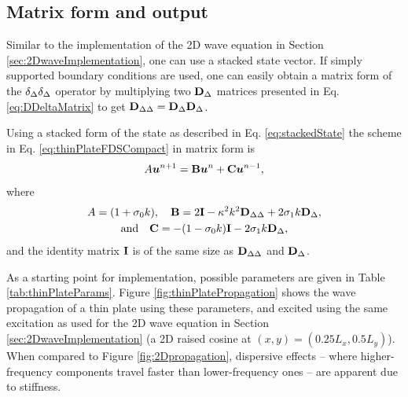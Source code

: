 \subsection{Matrix form and output}
Similar to the implementation of the 2D wave equation in Section \ref{sec:2DwaveImplementation}, one can use a stacked state vector. If simply supported boundary conditions are used, one can easily obtain a matrix form of the $\delta_{\Delta}\delta_{\Delta}$ operator by multiplying two $\mathbf{D}_\Delta$ matrices presented in Eq. \eqref{eq:DDeltaMatrix} to get $\mathbf{D}_{\Delta\Delta} = \mathbf{D}_\Delta\mathbf{D}_\Delta$.

Using a stacked form of the state as described in Eq. \eqref{eq:stackedState} the scheme in Eq. \eqref{eq:thinPlateFDSCompact} in matrix form is     
\begin{equation}\label{eq:matrixFormThinPlate}
    A\boldsymbol{u}^{n+1} = \mathbf{B}\boldsymbol{u}^n + \mathbf{C}\boldsymbol{u}^{n-1},
\end{equation}
where
\begin{gather*}
    A = (1+\sigma_{0} k),\quad \mathbf{B} = 2\mathbf{I} - \kappa^2 k^2 \mathbf{D}_{\Delta\Delta} + 2 \sigma_{1} k\mathbf{D}_\Delta, \\
    \text{and}\quad \mathbf{C} = -(1-\sigma_{0} k)\mathbf{I} - 2\sigma_{1} k \mathbf{D}_\Delta,
\end{gather*}
and the identity matrix $\mathbf{I}$ is of the same size as $\mathbf{D}_{\Delta\Delta}$ and $\mathbf{D}_\Delta$.

As a starting point for implementation, possible parameters are given in Table \ref{tab:thinPlateParams}. Figure \ref{fig:thinPlatePropagation} shows the wave propagation of a thin plate using these parameters, and excited using the same excitation as used for the 2D wave equation in Section \ref{sec:2DwaveImplementation} (a 2D raised cosine at $(x,y) = (0.25L_x, 0.5L_y)$). When compared to Figure \ref{fig:2Dpropagation}, dispersive effects -- where higher-frequency components travel faster than lower-frequency ones -- are apparent due to stiffness.

